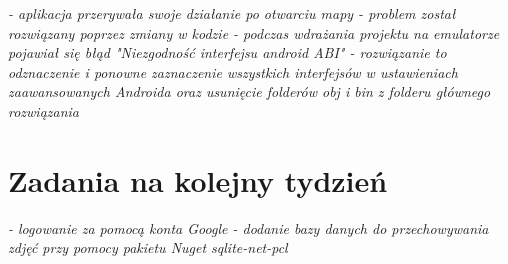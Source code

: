 \documentclass[12pt,a4paper]{mwart}
\begin{document}
\textit{\newline
- aplikacja przerywała swoje działanie po otwarciu mapy - problem został rozwiązany poprzez zmiany w kodzie
\newline
- podczas wdrażania projektu na emulatorze pojawiał się błąd "Niezgodność interfejsu android ABI" - rozwiązanie to odznaczenie i ponowne zaznaczenie wszystkich interfejsów w ustawieniach zaawansowanych Androida oraz usunięcie folderów obj i bin z folderu głównego rozwiązania
} %

\section{Zadania na kolejny tydzień}

\textit{\newline
- logowanie za pomocą konta Google 
\newline
- dodanie bazy danych do przechowywania zdjęć przy pomocy pakietu Nuget sqlite-net-pcl
} %
\end{document}

